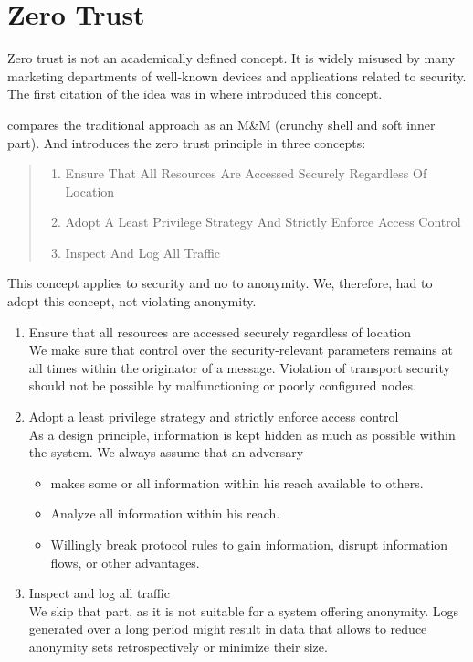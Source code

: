 \section{Zero Trust}\label{sec:zeroTrust}
Zero trust is not an academically defined concept. It is widely misused by many marketing departments of well-known devices and applications related to security. The first citation of the idea was in \cite{kindervag2010no} where \citeauthor{kindervag2010no} introduced this concept.

\citeauthor{kindervag2010no} compares the traditional approach as an M\&M (crunchy shell and soft inner part). And introduces the zero trust principle in three concepts:
\begin{quote}
	\begin{enumerate}
		\item Ensure That All Resources Are Accessed Securely Regardless Of Location
		\item Adopt A Least Privilege Strategy And Strictly Enforce Access Control
		\item Inspect And Log All Traffic
	\end{enumerate}
\end{quote}

This concept applies to security and no to anonymity. We, therefore, had to adopt this concept, not violating anonymity.
\begin{enumerate}
	\item Ensure that all resources are accessed securely regardless of location\\
	We make sure that control over the security-relevant parameters remains at all times within the originator of a message. Violation of transport security should not be possible by malfunctioning or poorly configured nodes.
	\item Adopt a least privilege strategy and strictly enforce access control\\
	As a design principle, information is kept hidden as much as possible within the system. We always assume that an adversary
	\begin{itemize}
		\item makes some or all information within his reach available to others.
		\item Analyze all information within his reach.
		\item Willingly break protocol rules to gain information, disrupt information flows, or other advantages.
	\end{itemize}		
	\item Inspect and log all traffic\\
	We skip that part, as it is not suitable for a system offering anonymity. Logs generated over a long period might result in data that allows to reduce anonymity sets retrospectively or minimize their size.
	
\end{enumerate}

